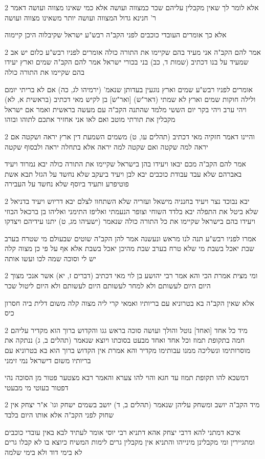 \documentclass[12pt, openany]{book}
\newcommand{\sethebfont}{
\fontsize{10.5pt}{21.0pt} \selectfont
}
\newcommand{\twocol}[1]{
	{\sethebfont \begin{multicols}{2}
			#1
	\end{multicols}}	
}
\begin{document}
\twocol{אלא לומר לך שאין מקבלין עליהם שכר כמצווה ועושה אלא כמי שאינו מצווה ועושה דאמר ר' חנינא גדול המצווה ועושה יותר משאינו מצווה ועושה
\par אלא כך אומרים העובדי כוכבים לפני הקב"ה רבש"ע ישראל שקיבלוה היכן קיימוה}
\twocol{אמר להם הקב"ה אני מעיד בהם שקיימו את התורה כולה אומרים לפניו רבש"ע כלום יש אב שמעיד על בנו דכתיב (שמות ד, כב) בני בכורי ישראל אמר להם הקב"ה שמים וארץ יעידו בהם שקיימו את התורה כולה
\par אומרים לפניו רבש"ע שמים וארץ נוגעין בעדותן שנאמ' (ירמיהו לג, כה) אם לא בריתי יומם ולילה חוקות שמים וארץ לא שמתי (דאר"ש) [ואר"ש] בן לקיש מאי דכתיב (בראשית א, לא) ויהי ערב ויהי בקר יום הששי מלמד שהתנה הקב"ה עם מעשה בראשית ואמר אם ישראל מקבלין את תורתי מוטב ואם לאו אני אחזיר אתכם לתוהו ובוהו}
\twocol{והיינו דאמר חזקיה מאי דכתיב (תהלים עו, ט) משמים השמעת דין ארץ יראה ושקטה אם יראה למה שקטה ואם שקטה למה יראה אלא בתחלה יראה ולבסוף שקטה
\par אמר להם הקב"ה מכם יבאו ויעידו בהן בישראל שקיימו את התורה כולה יבא נמרוד ויעיד באברהם שלא עבד עבודת כוכבים יבא לבן ויעיד ביעקב שלא נחשד על הגזל תבא אשת פוטיפרע ותעיד ביוסף שלא נחשד על העבירה}
\twocol{יבא נבוכד נצר ויעיד בחנניה מישאל ועזריה שלא השתחוו לצלם יבא דריוש ויעיד בדניאל שלא ביטל את התפלה יבא בלדד השוחי וצופר הנעמתי ואליפז התימני ואליהו בן ברכאל הבוזי ויעידו בהם בישראל שקיימו את כל התורה כולה שנאמר (ישעיהו מג, ט) יתנו עידיהם ויצדקו
\par אמרו לפניו רבש"ע תנה לנו מראש ונעשנה אמר להן הקב"ה שוטים שבעולם מי שטרח בערב שבת יאכל בשבת מי שלא טרח בערב שבת מהיכן יאכל בשבת אלא אף על פי כן מצוה קלה יש לי וסוכה שמה לכו ועשו אותה}
\twocol{ומי מצית אמרת הכי והא אמר רבי יהושע בן לוי מאי דכתיב (דברים ז, יא) אשר אנכי מצוך היום היום לעשותם ולא למחר לעשותם היום לעשותם ולא היום ליטול שכר
\par אלא שאין הקב"ה בא בטרוניא עם בריותיו ואמאי קרי ליה מצוה קלה משום דלית ביה חסרון כיס}
\twocol{מיד כל אחד [ואחד] נוטל והולך ועושה סוכה בראש גגו והקדוש ברוך הוא מקדיר עליהם חמה בתקופת תמוז וכל אחד ואחד מבעט בסוכתו ויוצא שנאמר (תהלים ב, ג) ננתקה את מוסרותימו ונשליכה ממנו עבותימו מקדיר והא אמרת אין הקדוש ברוך הוא בא בטרוניא עם בריותיו משום דישראל נמי זימני
\par דמשכא להו תקופת תמוז עד חגא והוי להו צערא והאמר רבא מצטער פטור מן הסוכה נהי דפטור בעוטי מי מבעטי}
\twocol{מיד הקב"ה יושב ומשחק עליהן שנאמר (תהלים ב, ד) יושב בשמים ישחק וגו' א"ר יצחק אין שחוק לפני הקב"ה אלא אותו היום בלבד
\par איכא דמתני להא דרבי יצחק אהא דתניא רבי יוסי אומר לעתיד לבא באין עובדי כוכבים ומתגיירין ומי מקבלינן מינייהו והתניא אין מקבלין גרים לימות המשיח כיוצא בו לא קבלו גרים לא בימי דוד ולא בימי שלמה}
\end{document}
